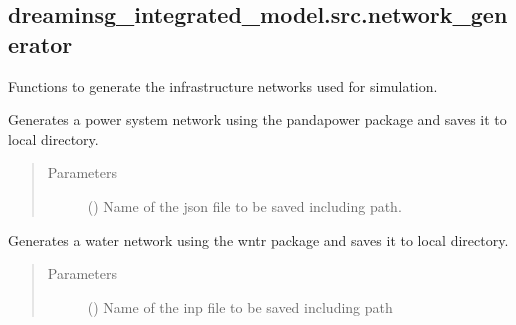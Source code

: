 \documentclass[letterpaper,10pt,english]{sphinxmanual}
\begin{document}
\subsection{dreaminsg\_integrated\_model.src.network\_generator}
\label{\detokenize{apidoc:module-dreaminsg_integrated_model.src.network_generator}}\label{\detokenize{apidoc:dreaminsg-integrated-model-src-network-generator}}
\sphinxAtStartPar
Functions to generate the infrastructure networks used for simulation.

\begin{fulllineitems}
\label{\detokenize{apidoc:dreaminsg_integrated_model.src.network_generator.generate_powern}}
\sphinxAtStartPar
Generates a power system network using the pandapower package and saves it to local directory.
\begin{quote}\begin{description}
\item[{Parameters}] \leavevmode
\sphinxAtStartPar
{} () \textendash{} Name of the json file to be saved including path.

\end{description}\end{quote}

\end{fulllineitems}


\begin{fulllineitems}
\label{\detokenize{apidoc:dreaminsg_integrated_model.src.network_generator.generate_watern}}
\sphinxAtStartPar
Generates a water network using the wntr package and saves it to local directory.
\begin{quote}\begin{description}
\item[{Parameters}] \leavevmode
\sphinxAtStartPar
{} () \textendash{} Name of the inp file to be saved including path

\end{description}\end{quote}

\end{fulllineitems}
\end{document}

